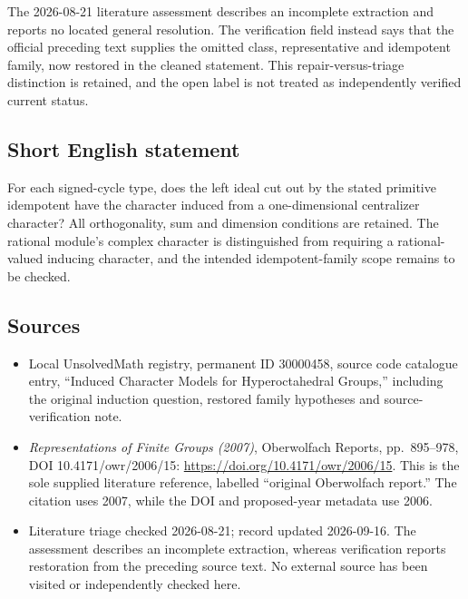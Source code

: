 \documentclass[11pt]{article}
\begin{document}
The 2026-08-21 literature assessment describes an incomplete extraction and reports no located general resolution. The verification field instead says that the official preceding text supplies the omitted class, representative and idempotent family, now restored in the cleaned statement. This repair-versus-triage distinction is retained, and the open label is not treated as independently verified current status.
\subsection{Short English statement}
For each signed-cycle type, does the left ideal cut out by the stated primitive idempotent have the character induced from a one-dimensional centralizer character? All orthogonality, sum and dimension conditions are retained. The rational module's complex character is distinguished from requiring a rational-valued inducing character, and the intended idempotent-family scope remains to be checked.
\subsection{Sources}
\begin{itemize}
\item Local UnsolvedMath registry, permanent ID 30000458, source code catalogue entry, ``Induced Character Models for Hyperoctahedral Groups,'' including the original induction question, restored family hypotheses and source-verification note.
\item \emph{Representations of Finite Groups (2007)}, Oberwolfach Reports, pp.\ 895--978, DOI 10.4171/owr/2006/15: \url{https://doi.org/10.4171/owr/2006/15}. This is the sole supplied literature reference, labelled ``original Oberwolfach report.'' The citation uses 2007, while the DOI and proposed-year metadata use 2006.
\item Literature triage checked 2026-08-21; record updated 2026-09-16. The assessment describes an incomplete extraction, whereas verification reports restoration from the preceding source text. No external source has been visited or independently checked here.
\end{itemize}
\end{document}
